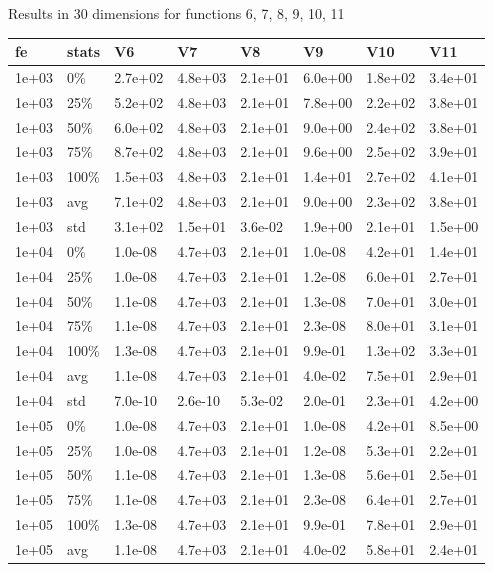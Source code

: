 \newpage
Results in 30 dimensions for functions 6, 7, 8, 9, 10, 11
\begin{longtable}{llllllll}
  \hline
fe & stats & V6 & V7 & V8 & V9 & V10 & V11 \\ 
  \hline
1e+03 & 0\% & 2.7e+02 & 4.8e+03 & 2.1e+01 & 6.0e+00 & 1.8e+02 & 3.4e+01 \\ 
  1e+03 & 25\% & 5.2e+02 & 4.8e+03 & 2.1e+01 & 7.8e+00 & 2.2e+02 & 3.8e+01 \\ 
  1e+03 & 50\% & 6.0e+02 & 4.8e+03 & 2.1e+01 & 9.0e+00 & 2.4e+02 & 3.8e+01 \\ 
  1e+03 & 75\% & 8.7e+02 & 4.8e+03 & 2.1e+01 & 9.6e+00 & 2.5e+02 & 3.9e+01 \\ 
  1e+03 & 100\% & 1.5e+03 & 4.8e+03 & 2.1e+01 & 1.4e+01 & 2.7e+02 & 4.1e+01 \\ 
  1e+03 & avg & 7.1e+02 & 4.8e+03 & 2.1e+01 & 9.0e+00 & 2.3e+02 & 3.8e+01 \\ 
  1e+03 & std & 3.1e+02 & 1.5e+01 & 3.6e-02 & 1.9e+00 & 2.1e+01 & 1.5e+00 \\ 
  1e+04 & 0\% & 1.0e-08 & 4.7e+03 & 2.1e+01 & 1.0e-08 & 4.2e+01 & 1.4e+01 \\ 
  1e+04 & 25\% & 1.0e-08 & 4.7e+03 & 2.1e+01 & 1.2e-08 & 6.0e+01 & 2.7e+01 \\ 
  1e+04 & 50\% & 1.1e-08 & 4.7e+03 & 2.1e+01 & 1.3e-08 & 7.0e+01 & 3.0e+01 \\ 
  1e+04 & 75\% & 1.1e-08 & 4.7e+03 & 2.1e+01 & 2.3e-08 & 8.0e+01 & 3.1e+01 \\ 
  1e+04 & 100\% & 1.3e-08 & 4.7e+03 & 2.1e+01 & 9.9e-01 & 1.3e+02 & 3.3e+01 \\ 
  1e+04 & avg & 1.1e-08 & 4.7e+03 & 2.1e+01 & 4.0e-02 & 7.5e+01 & 2.9e+01 \\ 
  1e+04 & std & 7.0e-10 & 2.6e-10 & 5.3e-02 & 2.0e-01 & 2.3e+01 & 4.2e+00 \\ 
  1e+05 & 0\% & 1.0e-08 & 4.7e+03 & 2.1e+01 & 1.0e-08 & 4.2e+01 & 8.5e+00 \\ 
  1e+05 & 25\% & 1.0e-08 & 4.7e+03 & 2.1e+01 & 1.2e-08 & 5.3e+01 & 2.2e+01 \\ 
  1e+05 & 50\% & 1.1e-08 & 4.7e+03 & 2.1e+01 & 1.3e-08 & 5.6e+01 & 2.5e+01 \\ 
  1e+05 & 75\% & 1.1e-08 & 4.7e+03 & 2.1e+01 & 2.3e-08 & 6.4e+01 & 2.7e+01 \\ 
  1e+05 & 100\% & 1.3e-08 & 4.7e+03 & 2.1e+01 & 9.9e-01 & 7.8e+01 & 2.9e+01 \\ 
  1e+05 & avg & 1.1e-08 & 4.7e+03 & 2.1e+01 & 4.0e-02 & 5.8e+01 & 2.4e+01 \\ 

\end{longtable}
